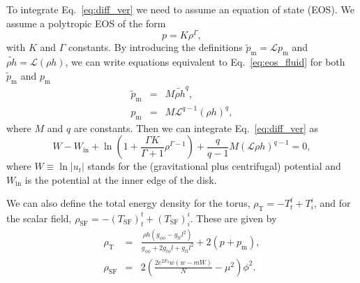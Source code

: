 \documentclass[twocolumn,aps,showpacs,showkeys,prd,superscriptaddress,byrevtex, amsmath]{revtex4-1}
\begin{document}
To integrate Eq.~\eqref{eq:diff_ver} we need to assume an equation of state (EOS). We assume a polytropic EOS of the form
\begin{equation}\label{eq:eos_fluid}
p = K \rho^{\Gamma},
\end{equation}
with $K$ and $\Gamma$ constants.
 By introducing the definitions $\tilde{p}_{\mathrm{m}} = \mathcal{L} p_{\mathrm{m}}$ and $\widetilde{\rho h} = \mathcal{L} (\rho h)$, we can write equations equivalent to Eq.~\eqref{eq:eos_fluid} for both $\tilde{p}_{\mathrm{m}}$ and $p_{\mathrm{m}}$
\begin{eqnarray}
\label{eq:eos_mag_tilde}
\tilde{p}_{\mathrm{m}} &=& M \widetilde{\rho h}^q,
\\
p_{\mathrm{m}} &=& M \mathcal{L}^{q-1} (\rho h)^q,
\end{eqnarray}
where $M$ and $q$ are constants. Then we can integrate Eq.~\eqref{eq:diff_ver} as
\begin{equation}\label{eq:final}
W - W_{\mathrm{in}} + \ln \left(1 + \frac{\Gamma K}{\Gamma +1}\rho^{\Gamma -1}\right) + \frac{q}{q-1}M(\mathcal{L}\rho h)^{q-1}=0,
\end{equation}
where $W \equiv \ln |u_t|$ stands for the (gravitational plus centrifugal) potential and  $W_{\mathrm{in}}$ is the potential at the inner edge of the disk.

We can also define the total energy density for the torus, $\rho_{\mathrm{T}}=-T^t_t + T^i_i$, and for the scalar field, $\rho_{\mathrm{SF}}=-(T_{\mathrm{SF}})^t_t + (T_{\mathrm{SF}})^i_i$. These are  given by
\begin{eqnarray}\label{eq:torus_energy_density}
\rho_{\mathrm{T}} &=&  \frac{\rho h (g_{\phi\phi} - g_{tt} l^2)}{g_{\phi\phi} + 2 g_{t\phi} l + g_{tt} l^2} + 2 (p + p_{\mathrm{m}}),
\\
\rho_{\mathrm{SF}} &=&  2 \left(\frac{2 e^{2 F_0} w (w-m W)}{N} - \mu^2\right) \phi^2.
\end{eqnarray}

%
\end{document}
